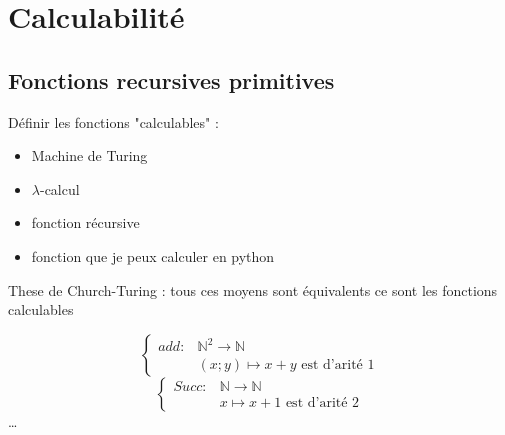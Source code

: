 \chapter{Calculabilité}
\section{Fonctions recursives primitives}

\begin{definition}[But]\label{def:butfoncprim}
    Définir les fonctions "calculables" :
    \begin{itemize}
        \item Machine de Turing
        \item  \(\lambda \)-calcul
        \item fonction récursive
        \item fonction que je peux calculer en python 
    \end{itemize}
    These de Church-Turing : tous ces moyens sont équivalents ce sont les fonctions calculables
\end{definition}


\begin{eg}[Exemples :]\label{eg:}
    \[
        \begin{cases}
            add: &\mathbb{N}^{2} \longrightarrow \mathbb{N} \\
            &(x;y) \longmapsto x+y \text{ est d'arité 1}
        \end{cases}
    \]
    \[
        \begin{cases}
            Succ: &\mathbb{N} \longrightarrow \mathbb{N}  \\
            &x \longmapsto x+1 \text{ est d'arité 2}
        \end{cases}
    \]
    \dots
\end{eg}

